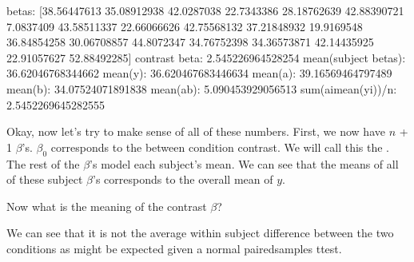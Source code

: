 \documentclass[letterpaper,10pt,english]{sphinxmanual}
\begin{document}
\begin{sphinxVerbatim}[commandchars=\\\{\}]
  \PYG{p}{[}    \PYG{p}{]}
  
  \PYG{p}{[} \PYG{p}{]} 
    
  
    
\end{sphinxVerbatim}

\begin{sphinxVerbatim}[commandchars=\\\{\}]
betas: [38.56447613 35.08912938 42.0287038  22.7343386  28.18762639 42.88390721
  7.0837409  43.58511337 22.66066626 42.75568132 37.21848932 19.9169548
 36.84854258 30.06708857 44.8072347  34.76752398 34.36573871 42.14435925
 22.91057627 52.88492285]
contrast beta: 2.545226964528254
mean(subject betas): 36.62046768344662
mean(y): 36.620467683446634
mean(a): 39.16569464797489
mean(b): 34.07524071891838
mean(a\PYGZhy{}b): 5.090453929056513
sum(a\PYGZus{}i\PYGZhy{}mean(y\PYGZus{}i))/n: 2.5452269645282555
\end{sphinxVerbatim}

\noindent{}

Okay, now let’s try to make sense of all of these numbers. First, we now have \(n\) + 1 \(\beta\)’s. \(\beta_0\) corresponds to the between condition contrast. We will call this the . The rest of the \(\beta\)’s model each subject’s mean. We can see that the means of all of these subject \(\beta\)’s corresponds to the overall mean of \(y\).

Now what is the meaning of the contrast \(\beta\)?

We can see that it is not the average within subject difference between the two conditions as might be expected given a normal paired\sphinxhyphen{}samples t\sphinxhyphen{}test.
\end{document}
